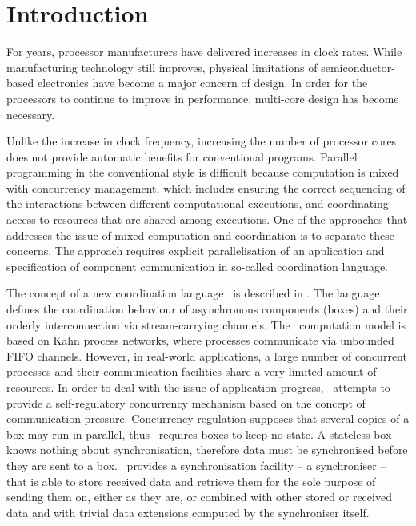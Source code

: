 \chapter{Introduction}
For years, processor manufacturers have delivered increases in clock rates. While manufacturing technology still improves, physical limitations of semiconductor-based electronics have become a major concern of design. In order for the processors to continue to improve in performance, multi-core design has become necessary.

Unlike the increase in clock frequency, increasing the number of processor cores does not provide automatic benefits for conventional programs. Parallel programming in the conventional style is difficult because computation is mixed with concurrency management, which includes ensuring the correct sequencing of the interactions between different computational executions, and coordinating access to resources that are shared among executions. One of the approaches that addresses the issue of mixed computation and coordination is to separate these concerns. The approach requires explicit parallelisation of an application and specification of component communication in so-called coordination language.

The concept of a new coordination language \ak\ is described in \cite{astrakahn}. The language defines the coordination behaviour of asynchronous components (boxes) and their orderly interconnection via stream-carrying channels. The \ak\ computation model is based on Kahn process networks, where processes communicate via unbounded FIFO channels. However, in real-world applications, a large number of concurrent processes and their communication facilities share a very limited amount of resources. In order to deal with the issue of application progress, \ak\ attempts to provide a self-regulatory concurrency mechanism based on the concept of communication pressure. Concurrency regulation supposes that several copies of a box may run in parallel, thus \ak\ requires boxes to keep no state. A stateless box knows nothing about synchronisation, therefore data must be synchronised before they are sent to a box. \ak\ provides a synchronisation facility -- a synchroniser -- that is able to store received data and retrieve them for the sole purpose of sending them on, either as they are, or combined with other stored or received data and with trivial data extensions computed by the synchroniser itself.


